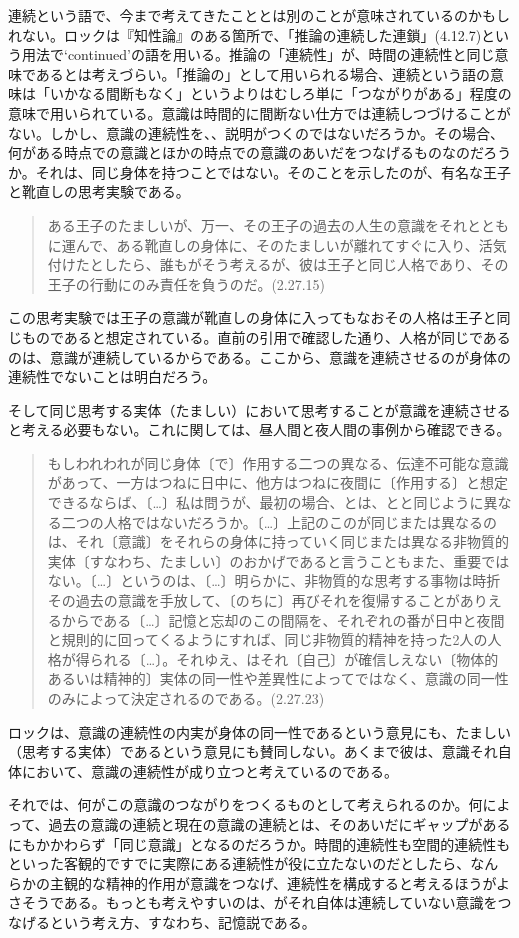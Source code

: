 \documentclass[a4j,oneside]{jsbook}
\begin{document}
\par
連続という語で、今まで考えてきたこととは別のことが意味されているのかもしれない。ロックは『知性論』のある箇所で、「推論の連続した連鎖」(4.12.7)という用法で‘continued’の語を用いる。推論の「連続性」が、時間の連続性と同じ意味であるとは考えづらい。「推論の」として用いられる場合、連続という語の意味は「いかなる間断もなく」というよりはむしろ単に「つながりがある」程度の意味で用いられている。意識は時間的に間断ない仕方では連続しつづけることがない。しかし、意識の連続性を、、説明がつくのではないだろうか。その場合、何がある時点での意識とほかの時点での意識のあいだをつなげるものなのだろうか。それは、同じ身体を持つことではない。そのことを示したのが、有名な王子と靴直しの思考実験である。
\begin{quote}
ある王子のたましいが、万一、その王子の過去の人生の意識をそれとともに運んで、ある靴直しの身体に、そのたましいが離れてすぐに入り、活気付けたとしたら、誰もがそう考えるが、彼は王子と同じ人格であり、その王子の行動にのみ責任を負うのだ。(2.27.15)
\end{quote}
この思考実験では王子の意識が靴直しの身体に入ってもなおその人格は王子と同じものであると想定されている。直前の引用で確認した通り、人格が同じであるのは、意識が連続しているからである。ここから、意識を連続させるのが身体の連続性でないことは明白だろう。
\par
そして同じ思考する実体（たましい）において思考することが意識を連続させると考える必要もない。これに関しては、昼人間と夜人間の事例から確認できる。
\begin{quote}
もしわれわれが同じ身体〔で〕作用する二つの異なる、伝達不可能な意識があって、一方はつねに日中に、他方はつねに夜間に〔作用する〕と想定できるならば、〔…〕私は問うが、最初の場合、とは、とと同じように異なる二つの人格ではないだろうか。〔…〕上記のこのが同じまたは異なるのは、それ〔意識〕をそれらの身体に持っていく同じまたは異なる非物質的実体〔すなわち、たましい〕のおかげであると言うこともまた、重要ではない。〔…〕というのは、〔…〕明らかに、非物質的な思考する事物は時折その過去の意識を手放して、〔のちに〕再びそれを復帰することがありえるからである〔…〕記憶と忘却のこの間隔を、それぞれの番が日中と夜間と規則的に回ってくるようにすれば、同じ非物質的精神を持った2人の人格が得られる〔…〕。それゆえ、はそれ〔自己〕が確信しえない〔物体的あるいは精神的〕実体の同一性や差異性によってではなく、意識の同一性のみによって決定されるのである。(2.27.23)
\end{quote}
ロックは、意識の連続性の内実が身体の同一性であるという意見にも、たましい（思考する実体）であるという意見にも賛同しない。あくまで彼は、意識それ自体において、意識の連続性が成り立つと考えているのである。
\par
それでは、何がこの意識のつながりをつくるものとして考えられるのか。何によって、過去の意識の連続と現在の意識の連続とは、そのあいだにギャップがあるにもかかわらず「同じ意識」となるのだろうか。時間的連続性も空間的連続性もといった客観的ですでに実際にある連続性が役に立たないのだとしたら、なんらかの主観的な精神的作用が意識をつなげ、連続性を構成すると考えるほうがよさそうである。もっとも考えやすいのは、がそれ自体は連続していない意識をつなげるという考え方、すなわち、記憶説である。
\end{document}
